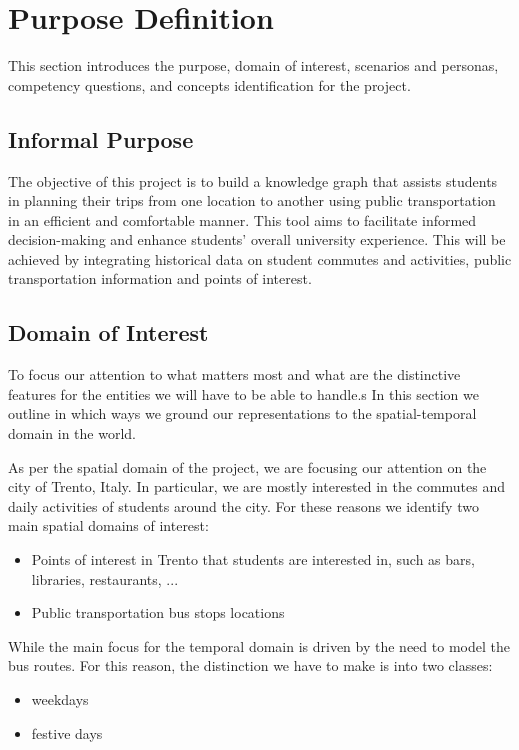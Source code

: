 \section{Purpose Definition}
This section introduces the purpose, domain of interest, scenarios and personas, competency questions, and concepts identification for the project.


\subsection{Informal Purpose}
The objective of this project is to build a knowledge graph that assists students in planning their trips from one location to another using public transportation in an efficient and comfortable manner. This tool aims to facilitate informed decision-making and enhance students' overall university experience. This will be achieved by integrating historical data on student commutes and activities, public transportation information and points of interest.

\subsection{Domain of Interest}
To focus our attention to what matters most and what are the distinctive features for the entities we will have to be able to handle.s
In this section we outline in which ways we ground our representations to the spatial-temporal domain in the world.

As per the spatial domain of the project, we are focusing our attention on the city of Trento, Italy. In particular, we are mostly interested in the commutes and daily activities of students around the city. For these reasons we identify two main spatial domains of interest: 
   \begin{itemize}
       \item Points of interest in Trento that students are interested in, such as bars, libraries, restaurants, ...
        \item Public transportation bus stops locations
   \end{itemize}
   
While the main focus for the temporal domain is driven by the need to model the bus routes. For this reason, the distinction we have to make is into two classes:
   \begin{itemize}
        \item weekdays
        \item festive days
   \end{itemize}

